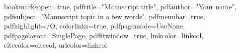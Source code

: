 \newenvironment{maxime}[1]
{
\vspace*{0cm}
\hfill
\begin{minipage}{0.5\textwidth}%
\hrulefill $\:$ {\bf #1}\\
\it
}%
{%

\hrulefill
\vspace*{0.5cm}%
\end{minipage}
}

\let\minitocORIG\minitoc
\renewcommand{\minitoc}{\minitocORIG \vspace{1.5em}}

\usepackage{subfigure}
\usepackage{multirow}

\newenvironment{bulletList}%
{ \begin{list}%
	{$\bullet$}%
	{\setlength{\labelwidth}{25pt}%
	 \setlength{\leftmargin}{30pt}%
	 \setlength{\itemsep}{\parsep}}}%
{ \end{list} }

\newtheorem{definition}{Definition}
\renewcommand{\epsilon}{\varepsilon}


\newenvironment{vcenterpage}
{\newpage\vspace*{\fill}\thispagestyle{empty}\renewcommand{\headrulewidth}{0pt}}
{\vspace*{\fill}}


\ifpdf
  \usepackage[hyperindex=true]{hyperref}
\else
  \usepackage[dvipdfm,hyperindex=true]{hyperref}
\fi





\hypersetup
{
bookmarksopen=true,
pdftitle="Manuscript title",
pdfauthor="Your name",
pdfsubject="Manuscript topic in a few words", %
pdfmenubar=true, %
pdfhighlight=/O, %
colorlinks=true, %
pdfpagemode=UseNone, %
pdfpagelayout=SinglePage, %
pdffitwindow=true, %
linkcolor=linkcol, %
citecolor=citecol, %
urlcolor=linkcol %
}

